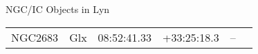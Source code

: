 \begin{block}{NGC/IC Objects in Lyn}
  \centering
  \begin{tabularx}{\textwidth}{llrrll} 
    NGC2683 & Glx & 08:52:41.33 & +33:25:18.3  & -- \\ 
  \end{tabularx}
\end{block}